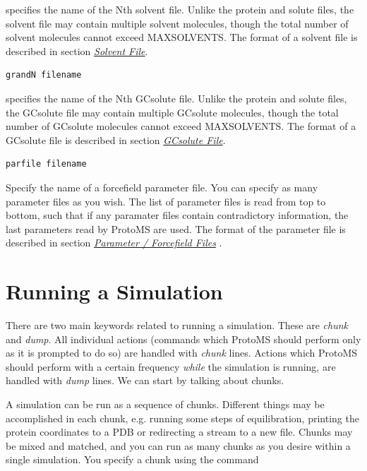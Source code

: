 \documentclass[letterpaper,10pt,english]{sphinxmanual}
\begin{document}
specifies the name of the Nth solvent file. Unlike the protein and solute files, the solvent file may contain multiple solvent molecules, though the total number of solvent molecules cannot exceed MAXSOLVENTS. The format of a solvent file is described in section {\hyperref[protoms:solventpdb]{\emph{Solvent File}}}.

\begin{Verbatim}[frame=single,commandchars=\\\{\}]
grandN filename
\end{Verbatim}

specifies the name of the Nth GCsolute file. Unlike the protein and solute files, the GCsolute file may contain multiple GCsolute molecules, though the total number of GCsolute molecules cannot exceed MAXSOLVENTS. The format of a GCsolute file is described in section {\hyperref[protoms:gcpdb]{\emph{GCsolute File}}}.

\begin{Verbatim}[frame=single,commandchars=\\\{\}]
parfile filename
\end{Verbatim}

Specify the name of a forcefield parameter file. You can specify as many parameter files as you wish. The list of parameter files is read from top to bottom, such that if any paramater files contain contradictory information, the last parameters read by ProtoMS are used. The format of the parameter file is described in section {\hyperref[protoms:parfil]{\emph{Parameter / Forcefield Files}}} .


\section{Running a Simulation}
\label{protoms:running-a-simulation}\label{protoms:runcmd}
There are two main keywords related to running a simulation. These are \emph{chunk} and \emph{dump}. All individual actions (commands which ProtoMS should perform only as it is prompted to do so) are handled with \emph{chunk} lines. Actions which ProtoMS should perform with a certain frequency \emph{while} the simulation is running, are handled with \emph{dump} lines. We can start by talking about chunks.

A simulation can be run as a sequence of chunks. Different things may be accomplished in each chunk, e.g. running some steps of equilibration, printing the protein coordinates to a PDB or redirecting a stream to a new file. Chunks may be mixed and matched, and you can run as many chunks as you desire within a single simulation. You specify a chunk using the command
\end{document}
